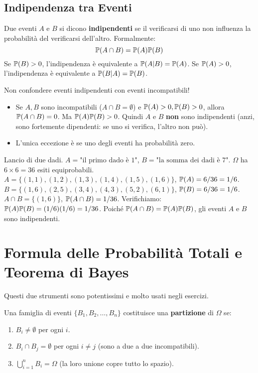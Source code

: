 \documentclass[12pt,a4paper]{article}
\begin{document}
\subsection{Indipendenza tra Eventi}
\begin{definition}
Due eventi $A$ e $B$ si dicono \textbf{indipendenti} se il verificarsi di uno non influenza la probabilità del verificarsi dell'altro. Formalmente:
\[ \mathbb{P}(A \cap B) = \mathbb{P}(A) \mathbb{P}(B) \]
Se $\mathbb{P}(B)>0$, l'indipendenza è equivalente a $\mathbb{P}(A|B) = \mathbb{P}(A)$.
Se $\mathbb{P}(A)>0$, l'indipendenza è equivalente a $\mathbb{P}(B|A) = \mathbb{P}(B)$.
\end{definition}

\begin{remark}
Non confondere eventi indipendenti con eventi incompatibili!
\begin{itemize}
    \item Se $A, B$ sono incompatibili ($A \cap B = \emptyset$) e $\mathbb{P}(A)>0, \mathbb{P}(B)>0$, allora $\mathbb{P}(A \cap B) = 0$. Ma $\mathbb{P}(A)\mathbb{P}(B) > 0$. Quindi $A$ e $B$ \textbf{non} sono indipendenti (anzi, sono fortemente dipendenti: se uno si verifica, l'altro non può).
    \item L'unica eccezione è se uno degli eventi ha probabilità zero.
\end{itemize}
\end{remark}

\begin{example}
Lancio di due dadi. $A = \text{"il primo dado è 1"}$, $B = \text{"la somma dei dadi è 7"}$.
$\Omega$ ha $6 \times 6 = 36$ esiti equiprobabili.
$A = \{(1,1), (1,2), (1,3), (1,4), (1,5), (1,6)\}$, $\mathbb{P}(A) = 6/36 = 1/6$.
$B = \{(1,6), (2,5), (3,4), (4,3), (5,2), (6,1)\}$, $\mathbb{P}(B) = 6/36 = 1/6$.
$A \cap B = \{(1,6)\}$, $\mathbb{P}(A \cap B) = 1/36$.
Verifichiamo: $\mathbb{P}(A)\mathbb{P}(B) = (1/6)(1/6) = 1/36$.
Poiché $\mathbb{P}(A \cap B) = \mathbb{P}(A)\mathbb{P}(B)$, gli eventi $A$ e $B$ sono indipendenti.
\end{example}

\section{Formula delle Probabilità Totali e Teorema di Bayes}
Questi due strumenti sono potentissimi e molto usati negli esercizi.

\begin{definition}
Una famiglia di eventi $\{B_1, B_2, \dots, B_n\}$ costituisce una \textbf{partizione} di $\Omega$ se:
\begin{enumerate}
    \item $B_i \neq \emptyset$ per ogni $i$.
    \item $B_i \cap B_j = \emptyset$ per ogni $i \neq j$ (sono a due a due incompatibili).
    \item $\bigcup_{i=1}^n B_i = \Omega$ (la loro unione copre tutto lo spazio).
\end{enumerate}
\end{definition}
\end{document}
